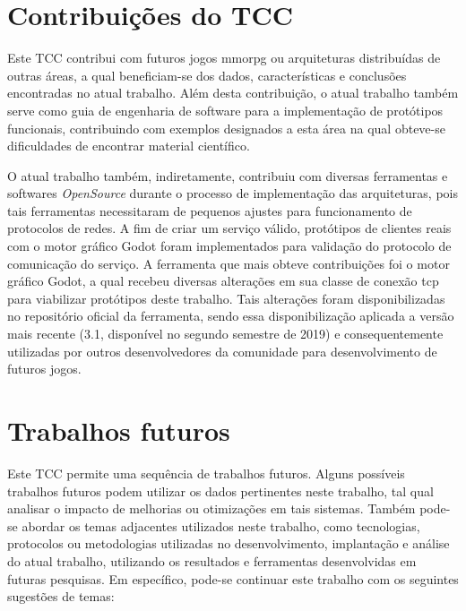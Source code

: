 \section{Contribuições do TCC}

Este TCC contribui com futuros jogos \ac{mmorpg} ou arquiteturas distribuídas de outras áreas, a qual beneficiam-se dos dados, características e conclusões encontradas no atual trabalho.
%
Além desta contribuição, o atual trabalho também serve como guia de engenharia de software para a implementação de protótipos funcionais, contribuindo com exemplos designados a esta área na qual obteve-se dificuldades de encontrar material científico.

O atual trabalho também, indiretamente, contribuiu com diversas ferramentas e softwares \textit{OpenSource} durante o processo de implementação das arquiteturas, pois tais ferramentas necessitaram de pequenos ajustes para funcionamento de protocolos de redes.
%
A fim de criar um serviço válido, protótipos de clientes reais com o motor gráfico Godot foram implementados para validação do protocolo de comunicação do serviço.
%
A ferramenta que mais obteve contribuições foi o motor gráfico Godot, a qual recebeu diversas alterações em sua classe de conexão \ac{tcp} para viabilizar protótipos deste trabalho.
%
Tais alterações foram disponibilizadas no repositório oficial da ferramenta, sendo essa disponibilização aplicada a versão mais recente (3.1, disponível no segundo semestre de 2019) e consequentemente utilizadas por outros desenvolvedores da comunidade para desenvolvimento de futuros jogos.




\section{Trabalhos futuros}

Este TCC permite uma sequência de trabalhos futuros.
%
Alguns possíveis trabalhos futuros podem utilizar os dados pertinentes neste trabalho, tal qual analisar o impacto de melhorias ou otimizações em tais sistemas.
%
Também pode-se abordar os temas adjacentes utilizados neste trabalho, como tecnologias, protocolos ou metodologias utilizadas no desenvolvimento, implantação e análise do atual trabalho, utilizando os resultados e ferramentas desenvolvidas em futuras pesquisas.
%
Em específico, pode-se continuar este trabalho com os seguintes sugestões de temas:

